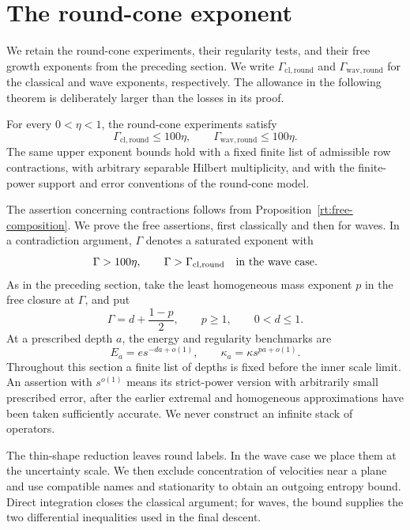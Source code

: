 \section{The round-cone exponent}
\label{sec:rt}

We retain the round-cone experiments, their regularity tests, and their
free growth exponents from the preceding section.  We write
$\Gamma_{\mathrm{cl},\mathrm{round}}$ and
$\Gamma_{\mathrm{wav},\mathrm{round}}$ for the classical and wave
exponents, respectively.  The allowance in the following theorem is
deliberately larger than the losses in its proof.

\begin{theorem}\label{thm:round}
For every $0<\eta<1$, the round-cone experiments satisfy
\[
 \Gamma_{\mathrm{cl},\mathrm{round}}\le 100\eta,
 \qquad
 \Gamma_{\mathrm{wav},\mathrm{round}}\le 100\eta.
\]
The same upper exponent bounds hold with a fixed finite list of admissible
row contractions, with arbitrary separable Hilbert multiplicity, and with
the finite-power support and error conventions of the round-cone model.
\end{theorem}

The assertion concerning contractions follows from
Proposition~\ref{rt:free-composition}.  We prove the free
assertions, first classically and then for waves.  In a contradiction
argument, $\Gamma$ denotes a saturated exponent with
\[
 \Gamma>100\eta,
 \qquad
 \Gamma>\Gamma_{\mathrm{cl},\mathrm{round}}
 \quad\hbox{in the wave case}.
\]
As in the preceding section, take the least homogeneous mass exponent
$p$ in the free closure at $\Gamma$, and put
\begin{equation}\label{eq:rt-pd}
 \Gamma=d+\frac{1-p}{2},\qquad
 p\ge1,\qquad 0<d\le1.
\end{equation}
At a prescribed depth $a$, the energy and regularity benchmarks are
\begin{equation}\label{eq:rt-benchmarks}
 E_a=e s^{-da+o(1)},\qquad
 \kappa_a=\kappa s^{pa+o(1)}.
\end{equation}
Throughout this section a finite list of depths is fixed before the
inner scale limit.  An assertion with $s^{o(1)}$ means its strict-power
version with arbitrarily small prescribed error, after the earlier
extremal and homogeneous approximations have been taken sufficiently
accurate.  We never construct an infinite stack of operators.

The thin-shape reduction leaves round labels. In the wave case we place
them at the uncertainty scale. We then exclude concentration of velocities
near a plane and use compatible names and stationarity to obtain an
outgoing entropy bound. Direct integration closes the classical argument;
for waves, the bound supplies the two differential inequalities used in
the final descent.

